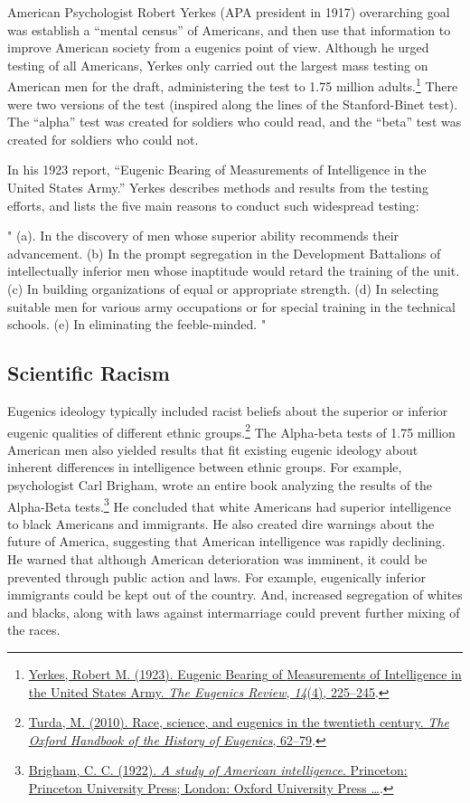 \documentclass[
  oneside,
  12pt]{crumpbook}
\begin{document}
American Psychologist Robert Yerkes (APA president in 1917) overarching goal was establish a ``mental census'' of Americans, and then use that information to improve American society from a eugenics point of view. Although he urged testing of all Americans, Yerkes only carried out the largest mass testing on American men for the draft, administering the test to 1.75 million adults.\footnote{\protect\hyperlink{ref-yerkesEugenicBearingMeasurements1923}{Yerkes, Robert M. (1923). Eugenic {Bearing} of {Measurements} of {Intelligence} in the {United States Army}. \emph{The Eugenics Review}, \emph{14}(4), 225--245}.} There were two versions of the test (inspired along the lines of the Stanford-Binet test). The ``alpha'' test was created for soldiers who could read, and the ``beta'' test was created for soldiers who could not.

In his 1923 report, ``Eugenic Bearing of Measurements of Intelligence in the United States Army.'' Yerkes describes methods and results from the testing efforts, and lists the five main reasons to conduct such widespread testing:

"
(a). In the discovery of men whose superior ability recommends their advancement.
(b) In the prompt segregation in the Development Battalions of intellectually inferior men whose inaptitude would retard the training of the unit.
(c) In building organizations of equal or appropriate strength.
(d) In selecting suitable men for various army occupations or for special
training in the technical schools.
(e) In eliminating the feeble-minded.
"

\hypertarget{scientific-racism}{%
\subsection{Scientific Racism}\label{scientific-racism}}

Eugenics ideology typically included racist beliefs about the superior or inferior eugenic qualities of different ethnic groups.\footnote{\protect\hyperlink{ref-turdaRaceScienceEugenics2010}{Turda, M. (2010). Race, science, and eugenics in the twentieth century. \emph{The Oxford Handbook of the History of Eugenics}, 62--79}.} The Alpha-beta tests of 1.75 million American men also yielded results that fit existing eugenic ideology about inherent differences in intelligence between ethnic groups. For example, psychologist Carl Brigham, wrote an entire book analyzing the results of the Alpha-Beta tests.\footnote{\protect\hyperlink{ref-brighamStudyAmericanIntelligence1922}{Brigham, C. C. (1922). \emph{A study of {American} intelligence}. {Princeton: Princeton University Press; London: Oxford University Press \ldots{}}}.} He concluded that white Americans had superior intelligence to black Americans and immigrants. He also created dire warnings about the future of America, suggesting that American intelligence was rapidly declining. He warned that although American deterioration was imminent, it could be prevented through public action and laws. For example, eugenically inferior immigrants could be kept out of the country. And, increased segregation of whites and blacks, along with laws against intermarriage could prevent further mixing of the races.
\end{document}
